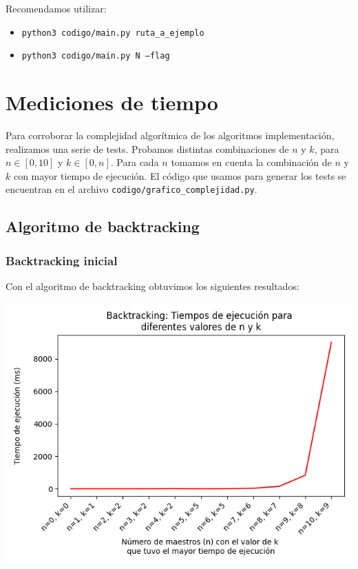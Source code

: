 \documentclass{article}
\begin{document}
Recomendamos utilizar:
\begin{itemize}
    \item \texttt{python3\ codigo/main.py\ ruta\_a\_ejemplo}
    \item \texttt{python3\ codigo/main.py\ N\ --flag}
\end{itemize}


\section{Mediciones de tiempo}
\label{sec:medTiempo}
Para corroborar la complejidad algorítmica de los algoritmos implementación, realizamos una serie de tests. Probamos distintas combinaciones de $n$ y $k$, para $n \in [0, 10]$ y $k \in [0, n]$. Para cada $n$ tomamos en cuenta la combinación de $n$ y $k$ con mayor tiempo de ejecución. El código que usamos para generar los tests se encuentran en el archivo 
\texttt{codigo/grafico\_complejidad.py}.

\subsection{Algoritmo de backtracking}
\subsubsection{Backtracking inicial}

Con el algoritmo de backtracking obtuvimos los siguientes resultados:

\includegraphics[scale=0.60]{images/graficoBacktrackingGreedy.png}
\end{document}
